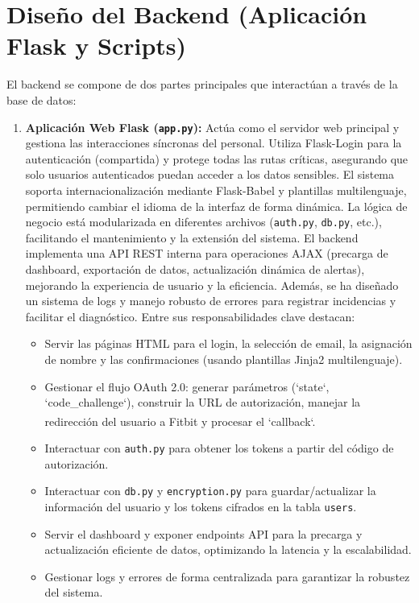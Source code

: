 \section{Diseño del Backend (Aplicación Flask y Scripts)}
\label{sec:diseno_backend}

El backend se compone de dos partes principales que interactúan a través de la base de datos:

\begin{enumerate}
    \item \textbf{Aplicación Web Flask (\texttt{app.py}):} Actúa como el servidor web principal y gestiona las interacciones síncronas del personal. Utiliza Flask-Login para la autenticación (compartida) y protege todas las rutas críticas, asegurando que solo usuarios autenticados puedan acceder a los datos sensibles. El sistema soporta internacionalización mediante Flask-Babel y plantillas multilenguaje, permitiendo cambiar el idioma de la interfaz de forma dinámica. La lógica de negocio está modularizada en diferentes archivos (\texttt{auth.py}, \texttt{db.py}, etc.), facilitando el mantenimiento y la extensión del sistema. El backend implementa una API REST interna para operaciones AJAX (precarga de dashboard, exportación de datos, actualización dinámica de alertas), mejorando la experiencia de usuario y la eficiencia. Además, se ha diseñado un sistema de logs y manejo robusto de errores para registrar incidencias y facilitar el diagnóstico. Entre sus responsabilidades clave destacan:
        \begin{itemize}
            \item Servir las páginas HTML para el login, la selección de email, la asignación de nombre y las confirmaciones (usando plantillas Jinja2 multilenguaje).
            \item Gestionar el flujo OAuth 2.0: generar parámetros (`state`, `code\_challenge`), construir la URL de autorización, manejar la redirección del usuario a Fitbit\textsuperscript{\textregistered} y procesar el `callback`.
            \item Interactuar con \texttt{auth.py} para obtener los tokens a partir del código de autorización.
            \item Interactuar con \texttt{db.py} y \texttt{encryption.py} para guardar/actualizar la información del usuario y los tokens cifrados en la tabla \texttt{users}.
            \item Servir el dashboard y exponer endpoints API para la precarga y actualización eficiente de datos, optimizando la latencia y la escalabilidad.
            \item Gestionar logs y errores de forma centralizada para garantizar la robustez del sistema.
        \end{itemize}


\end{enumerate}
